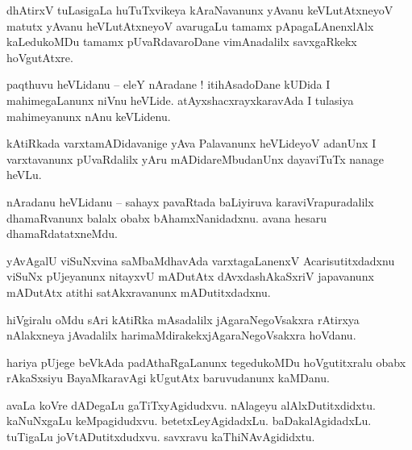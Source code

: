 \documentclass{article}
\begin{document}
\begin{mn}%
dhAtirxV tuLasigaLa huTuTxvikeya kAraNavanunx yAvanu keVLutAtxneyoV matutx yAvanu heVLutAtxneyoV 
avarugaLu tamamx pApagaLAnenxlAlx kaLedukoMDu tamamx pUvaRdavaroDane vimAnadalilx savxgaRkekx 
hoVgutAtxre.
\end{mn}


\begin{mn}%
paqthuvu heVLidanu -- eleY nAradane ! itihAsadoDane kUDida I mahimegaLanunx niVnu heVLide. 
atAyxshacxrayxkaravAda I tulasiya mahimeyanunx nAnu keVLidenu.
\end{mn}

\begin{mn}%
kAtiRkada varxtamADidavanige yAva Palavanunx heVLideyoV adanUnx I varxtavanunx pUvaRdalilx yAru 
mADidareMbudanUnx dayaviTuTx nanage heVLu.
\end{mn}

\begin{mn}%
nAradanu heVLidanu -- sahayx pavaRtada baLiyiruva karaviVrapuradalilx dhamaRvanunx balalx obabx 
bAhamxNanidadxnu. avana hesaru dhamaRdatatxneMdu.
\end{mn}

\begin{mn}%
yAvAgalU viSuNxvina saMbaMdhavAda varxtagaLanenxV Acarisutitxdadxnu viSuNx pUjeyanunx nitayxvU 
mADutAtx dAvxdashAkaSxriV japavanunx mADutAtx atithi satAkxravanunx mADutitxdadxnu.
\end{mn}

\begin{mn}%
hiVgiralu oMdu sAri kAtiRka mAsadalilx jAgaraNegoVsakxra rAtirxya nAlakxneya jAvadalilx 
harimaMdirakekxjAgaraNegoVsakxra hoVdanu.
\end{mn}

\begin{mn}%
hariya pUjege beVkAda padAthaRgaLanunx tegedukoMDu hoVgutitxralu obabx rAkaSxsiyu BayaMkaravAgi 
kUgutAtx baruvudanunx kaMDanu.
\end{mn}

\begin{mn}%
avaLa koVre dADegaLu gaTiTxyAgidudxvu. nAlageyu alAlxDutitxdidxtu. kaNuNxgaLu keMpagidudxvu. 
betetxLeyAgidadxLu. baDakalAgidadxLu. tuTigaLu joVtADutitxdudxvu. savxravu kaThiNAvAgididxtu.
\end{mn}
\end{document}
